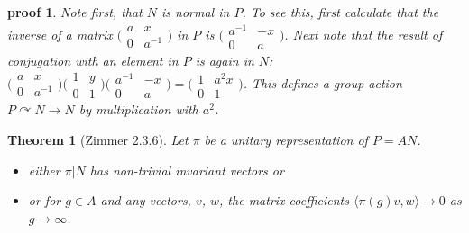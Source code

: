 \documentclass[
  12pt
]{article}
\theoremstyle{break}
\newtheorem{thm}{Theorem}[section]
\theoremstyle{plain}
\newtheorem*{pf}{proof}
\newcommand{\mpi}{\ensuremath{\pi}\xspace}
\newcommand{\ipmatrix}[1]{%
\ensuremath{\big(\begin{smallmatrix} #1 \end{smallmatrix}\big)}\xspace}
\begin{document}
\begin{pf}
    Note first, that $N$ is normal in $P$. To see this, first calculate that the
    inverse of a matrix $\ipmatrix{ a & x \\ 0 & a^{-1} }$ in $P$ is $\ipmatrix{
    a^{-1} & -x \\ 0 & a }$. Next note that the result of conjugation with an
    element in $P$ is again in $N$: $\ipmatrix{ a & x \\ 0 & a^{-1} } \ipmatrix{1 &
    y \\ 0 & 1} \ipmatrix{ a^{-1} & -x \\ 0 & a } = \ipmatrix{1 & a^2x \\ 0 & 1}$.
    This defines a group action $P \curvearrowright N \rightarrow N$ by
    multiplication with $a^2$.
  \end{pf}

  \begin{thm}[Zimmer 2.3.6]
    \label{thm:2.3.6}
    Let \mpi be  a unitary representation of $P = AN$.
    \begin{itemize}
      \item either $\pi|N$ has non-trivial invariant vectors or
      \item or for $g \in A$ and any vectors, $v$, $w$, the matrix coefficients
        $\langle \pi(g)v, w \rangle \rightarrow 0$ as $g \rightarrow \infty$.
    \end{itemize}
  \end{thm}
\end{document}
